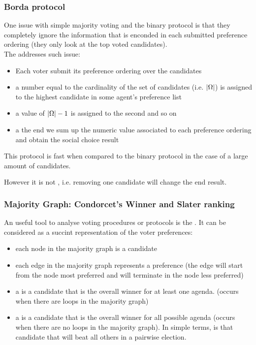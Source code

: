 \subsubsection{Borda protocol}
One issue with simple majority voting and the binary protocol is that they completely ignore the information that is enconded in each submitted preference ordering (they only look at the top voted candidates).\\
The  addresses such issue:
\begin{itemize}
\item Each voter submit its preference ordering over the candidates
\item a number equal to the cardinality of the set of candidates (i.e. $\lvert\Omega\rvert$) is assigned to the highest candidate in some agent's preference list
\item a value of $\lvert\Omega\rvert-1$ is assigned to the second and so on
\item a the end we sum up the numeric value associated to each preference ordering and obtain the social choice result
\end{itemize}

This protocol is fast when compared to the binary protocol in the case of a large amount of candidates.

However it is not  , i.e. removing one candidate will change the end result.


\subsubsection{Majority Graph: Condorcet's Winner and Slater ranking}
An useful tool to analyse voting procedures or protocols is the . It can be considered as a succint representation of the voter preferences:
\begin{itemize}
\item each node in the majority graph is a candidate
\item each edge in the majority graph represents a preference (the edge will start from the node most preferred and will terminate in the node less preferred)
\item a  is a candidate that is the overall winner for at least one agenda. (occurs when there are loops in the majority graph)
\item a  is a candidate that is the overall winner for all possible agenda (occurs when there are no loops in the majority graph). In simple terms, is that candidate that will beat all others in a pairwise election.
\end{itemize}

